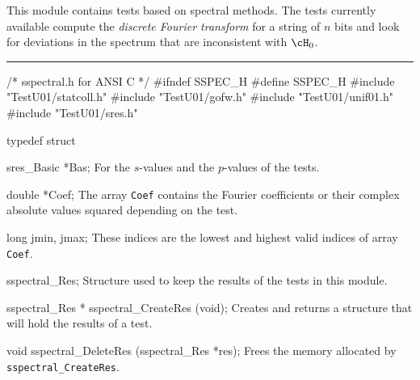 
This module contains tests based on spectral methods.
%
%
The tests currently available compute the {\em discrete Fourier transform\/}
for a string of $n$ bits and look for deviations in the spectrum
%
that are inconsistent with $\cH_0$.  
\resdef

\bigskip
\hrule
\code\hide
/* sspectral.h  for ANSI C */
#ifndef SSPEC_H
#define SSPEC_H
\endhide
#include "TestU01/statcoll.h"
#include "TestU01/gofw.h"
#include "TestU01/unif01.h"
#include "TestU01/sres.h"
\endcode

\ifdetailed %

\code
typedef struct {

   sres_Basic *Bas;
\endcode
 \tabb
  For the $s$-values and the $p$-values of the tests.
 \endtabb
\code

   double *Coef;
\endcode
 \tabb  The array {\tt Coef} contains the
  Fourier coefficients or their complex absolute values squared
  depending on the test.
 \endtabb
\code

   long jmin, jmax;
\endcode
 \tabb
  These indices are the lowest and highest valid indices
  of array {\tt Coef}.
 \endtabb
\code

} sspectral_Res;
\endcode
 \tab
  Structure used to keep the results of the tests in this module.
 \endtab
\code


sspectral_Res * sspectral_CreateRes (void);
\endcode
 \tab 
  Creates and returns a structure that will hold the results
  of a test. 
 \endtab
\code


void sspectral_DeleteRes (sspectral_Res *res);
\endcode
 \tab 
  Frees the memory allocated by {\tt sspectral\_CreateRes}.
 \endtab

\fi    %



\code

